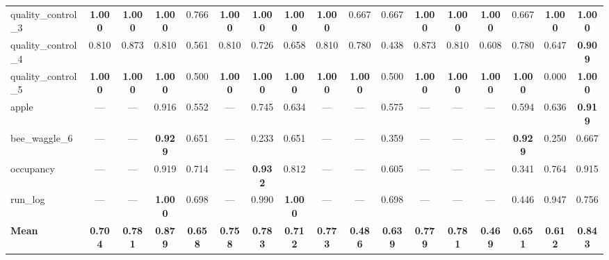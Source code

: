 \documentclass[11pt,a4paper]{article}
\begin{document}
\begin{table}
{\begin{tabular}{lcccccccccccccccc}
quality\_control\_3 & \textbf{1.000} & \textbf{1.000} & \textbf{1.000} & 0.766 & \textbf{1.000} & \textbf{1.000} & \textbf{1.000} & \textbf{1.000} & 0.667 & 0.667 & \textbf{1.000} & \textbf{1.000} & \textbf{1.000} & 0.667 & \textbf{1.000} & \textbf{1.000} \\
quality\_control\_4 & 0.810 & 0.873 & 0.810 & 0.561 & 0.810 & 0.726 & 0.658 & 0.810 & 0.780 & 0.438 & 0.873 & 0.810 & 0.608 & 0.780 & 0.647 & \textbf{0.909} \\
quality\_control\_5 & \textbf{1.000} & \textbf{1.000} & \textbf{1.000} & 0.500 & \textbf{1.000} & \textbf{1.000} & \textbf{1.000} & \textbf{1.000} & \textbf{1.000} & 0.500 & \textbf{1.000} & \textbf{1.000} & \textbf{1.000} & \textbf{1.000} & 0.000 & \textbf{1.000} \\
apple & — & — & 0.916 & 0.552 & — & 0.745 & 0.634 & — & — & 0.575 & — & — & — & 0.594 & 0.636 & \textbf{0.919} \\
bee\_waggle\_6 & — & — & \textbf{0.929} & 0.651 & — & 0.233 & 0.651 & — & — & 0.359 & — & — & — & \textbf{0.929} & 0.250 & 0.667 \\
occupancy & — & — & 0.919 & 0.714 & — & \textbf{0.932} & 0.812 & — & — & 0.605 & — & — & — & 0.341 & 0.764 & 0.915 \\
run\_log & — & — & \textbf{1.000} & 0.698 & — & 0.990 & \textbf{1.000} & — & — & 0.698 & — & — & — & 0.446 & 0.947 & 0.756 \\
\midrule
\textbf{Mean} & \textbf{0.704} & \textbf{0.781} & \textbf{0.879} & \textbf{0.658} & \textbf{0.758} & \textbf{0.783} & \textbf{0.712} & \textbf{0.773} & \textbf{0.486} & \textbf{0.639} & \textbf{0.779} & \textbf{0.781} & \textbf{0.469} & \textbf{0.651} & \textbf{0.612} & \textbf{0.843} \\
\bottomrule
\end{tabular}%
}
\end{table}
\clearpage
\end{document}

